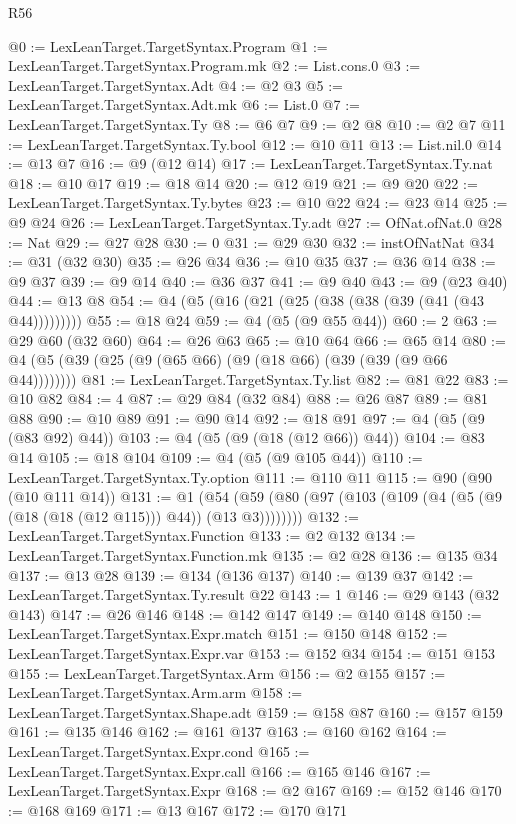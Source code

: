 \begin{lexlean}{R56}
\begin{coremodule}
{{{{{{{{{{{{{{{{{{{{{{{{{{{{{{{{{{{{{{{{{{{{{{{{{{{{{{{{{{{{{{{{{{{{{{{{{{{{{{{{{{{{{{{{{{{{{{{{{{{{{{{{{{{{{{{{{{{{{{{{{{{{{{{{{{{{{{{{{{{{{{{{{{{{{{{{{{{{{{{{{{{{{{{{{{{{{{{{{{{{{{{{{{{{{{{{{{{{{{{{{{{{{{{{{{{@0 := LexLeanTarget.TargetSyntax.Program
@1 := LexLeanTarget.TargetSyntax.Program.mk
@2 := List.cons.{0}
@3 := LexLeanTarget.TargetSyntax.Adt
@4 := @2 @3
@5 := LexLeanTarget.TargetSyntax.Adt.mk
@6 := List.{0}
@7 := LexLeanTarget.TargetSyntax.Ty
@8 := @6 @7
@9 := @2 @8
@10 := @2 @7
@11 := LexLeanTarget.TargetSyntax.Ty.bool
@12 := @10 @11
@13 := List.nil.{0}
@14 := @13 @7
@16 := @9 (@12 @14)
@17 := LexLeanTarget.TargetSyntax.Ty.nat
@18 := @10 @17
@19 := @18 @14
@20 := @12 @19
@21 := @9 @20
@22 := LexLeanTarget.TargetSyntax.Ty.bytes
@23 := @10 @22
@24 := @23 @14
@25 := @9 @24
@26 := LexLeanTarget.TargetSyntax.Ty.adt
@27 := OfNat.ofNat.{0}
@28 := Nat
@29 := @27 @28
@30 := 0
@31 := @29 @30
@32 := instOfNatNat
@34 := @31 (@32 @30)
@35 := @26 @34
@36 := @10 @35
@37 := @36 @14
@38 := @9 @37
@39 := @9 @14
@40 := @36 @37
@41 := @9 @40
@43 := @9 (@23 @40)
@44 := @13 @8
@54 := @4 (@5 (@16 (@21 (@25 (@38 (@38 (@39 (@41 (@43 @44)))))))))
@55 := @18 @24
@59 := @4 (@5 (@9 @55 @44))
@60 := 2
@63 := @29 @60 (@32 @60)
@64 := @26 @63
@65 := @10 @64
@66 := @65 @14
@80 := @4 (@5 (@39 (@25 (@9 (@65 @66) (@9 (@18 @66) (@39 (@39 (@9 @66 @44))))))))
@81 := LexLeanTarget.TargetSyntax.Ty.list
@82 := @81 @22
@83 := @10 @82
@84 := 4
@87 := @29 @84 (@32 @84)
@88 := @26 @87
@89 := @81 @88
@90 := @10 @89
@91 := @90 @14
@92 := @18 @91
@97 := @4 (@5 (@9 (@83 @92) @44))
@103 := @4 (@5 (@9 (@18 (@12 @66)) @44))
@104 := @83 @14
@105 := @18 @104
@109 := @4 (@5 (@9 @105 @44))
@110 := LexLeanTarget.TargetSyntax.Ty.option
@111 := @110 @11
@115 := @90 (@90 (@10 @111 @14))
@131 := @1 (@54 (@59 (@80 (@97 (@103 (@109 (@4 (@5 (@9 (@18 (@18 (@12 @115))) @44)) (@13 @3))))))))
@132 := LexLeanTarget.TargetSyntax.Function
@133 := @2 @132
@134 := LexLeanTarget.TargetSyntax.Function.mk
@135 := @2 @28
@136 := @135 @34
@137 := @13 @28
@139 := @134 (@136 @137)
@140 := @139 @37
@142 := LexLeanTarget.TargetSyntax.Ty.result @22
@143 := 1
@146 := @29 @143 (@32 @143)
@147 := @26 @146
@148 := @142 @147
@149 := @140 @148
@150 := LexLeanTarget.TargetSyntax.Expr.match
@151 := @150 @148
@152 := LexLeanTarget.TargetSyntax.Expr.var
@153 := @152 @34
@154 := @151 @153
@155 := LexLeanTarget.TargetSyntax.Arm
@156 := @2 @155
@157 := LexLeanTarget.TargetSyntax.Arm.arm
@158 := LexLeanTarget.TargetSyntax.Shape.adt
@159 := @158 @87
@160 := @157 @159
@161 := @135 @146
@162 := @161 @137
@163 := @160 @162
@164 := LexLeanTarget.TargetSyntax.Expr.cond
@165 := LexLeanTarget.TargetSyntax.Expr.call
@166 := @165 @146
@167 := LexLeanTarget.TargetSyntax.Expr
@168 := @2 @167
@169 := @152 @146
@170 := @168 @169
@171 := @13 @167
@172 := @170 @171
}}}}}}}}}}}}}}}}}}}}}}}}}}}}}}}}}}}}}}}}}}}}}}}}}}}}}}}}}}}}}}}}}}}}}}}}}}}}}}}}}}}}}}}}}}}}}}}}}}}}}}}}}}}}}}}}}}}}}}}}}}}}}}}}}}}}}}}}}}}}}}}}}}}}}}}}}}}}}}}}}}}}}}}}}}}}}}}}}}}}}}}}}}}}}}}}}}}}}}}}}}}}}}}}}}}
\end{coremodule}
\end{lexlean}
